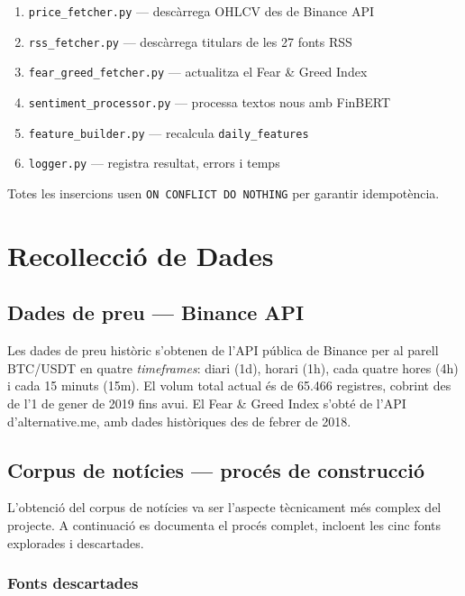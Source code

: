 \documentclass[12pt, a4paper]{report}
\begin{document}
\begin{enumerate}
  \item \texttt{price\_fetcher.py} --- descàrrega OHLCV des de Binance API
  \item \texttt{rss\_fetcher.py} --- descàrrega titulars de les 27 fonts RSS
  \item \texttt{fear\_greed\_fetcher.py} --- actualitza el Fear \& Greed Index
  \item \texttt{sentiment\_processor.py} --- processa textos nous amb FinBERT
  \item \texttt{feature\_builder.py} --- recalcula \texttt{daily\_features}
  \item \texttt{logger.py} --- registra resultat, errors i temps
\end{enumerate}

Totes les insercions usen \texttt{ON CONFLICT DO NOTHING} per garantir idempotència.

\chapter{Recol\textperiodcentered{}lecció de Dades}

\section{Dades de preu --- Binance API}

Les dades de preu històric s'obtenen de l'API pública de Binance per al parell BTC/USDT en quatre \textit{timeframes}: diari (1d), horari (1h), cada quatre hores (4h) i cada 15 minuts (15m). El volum total actual és de 65.466 registres, cobrint des de l'1 de gener de 2019 fins avui. El Fear \& Greed Index s'obté de l'API d'alternative.me, amb dades històriques des de febrer de 2018.

\section{Corpus de notícies --- procés de construcció}

L'obtenció del corpus de notícies va ser l'aspecte tècnicament més complex del projecte. A continuació es documenta el procés complet, incloent les cinc fonts explorades i descartades.

\subsection{Fonts descartades}
\end{document}
